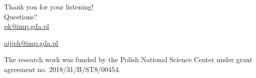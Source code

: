 \documentclass[10pt,aspectratio=169,dvipsnames]{beamer} %
\begin{document}
		{
			\begin{frame}[standout]
				Thank you for your listening!\\ \vspace{12pt}
				Questions?\\ \vspace{12pt}
				\url{pk@imp.gda.pl} 
				\par\medskip
				\url{aijjeh@imp.gda.pl}
				
				
				\par\medskip
				\par\medskip
				\footnotesize
				The research work was funded by the Polish National Science Center under grant agreement no. 2018/31/B/ST8/00454.
			\end{frame}
		}
	
\end{document}
